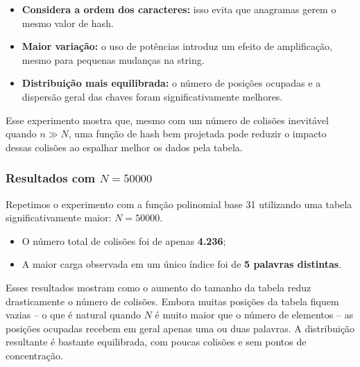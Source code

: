 \begin{itemize}
  \item \textbf{Considera a ordem dos caracteres:} isso evita que anagramas gerem o mesmo valor de hash.
  \item \textbf{Maior variação:} o uso de potências introduz um efeito de amplificação, mesmo para pequenas mudanças na string.
  \item \textbf{Distribuição mais equilibrada:} o número de posições ocupadas e a dispersão geral das chaves foram significativamente melhores.
\end{itemize}

Esse experimento mostra que, mesmo com um número de colisões inevitável quando $n \gg N$, uma função de hash bem projetada pode reduzir o impacto dessas colisões ao espalhar melhor os dados pela tabela.

\subsubsection*{Resultados com $N = 50000$}

Repetimos o experimento com a função polinomial base 31 utilizando uma tabela significativamente maior: $N = 50000$.

\begin{itemize}
  \item O número total de colisões foi de apenas \textbf{4.236};
  \item A maior carga observada em um único índice foi de \textbf{5 palavras distintas}.
\end{itemize}

Esses resultados mostram como o aumento do tamanho da tabela reduz drasticamente o número de colisões. 
Embora muitas posições da tabela fiquem vazias -- o que é natural quando $N$ é muito maior que o número de elementos -- as posições ocupadas recebem em geral apenas uma ou duas palavras. 
A distribuição resultante é bastante equilibrada, com poucas colisões e sem pontos de concentração.


